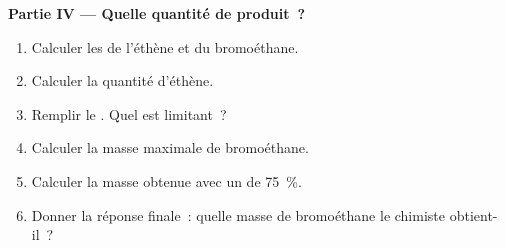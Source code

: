 \begin{problem}
\medskip
\noindent\textbf{Partie IV --- Quelle quantité de produit~?}
\begin{enumerate}[resume]
  \item Calculer les  de l'éthène et du bromoéthane.
  \item Calculer la quantité d'éthène.
  \item Remplir le . Quel  est limitant~?
  \item Calculer la masse maximale de bromoéthane.
  \item Calculer la masse obtenue avec un  de
        \qty{75}{\percent}.
  \item Donner la réponse finale~: quelle masse de bromoéthane le
        chimiste obtient-il~?
\end{enumerate}
\end{problem}
